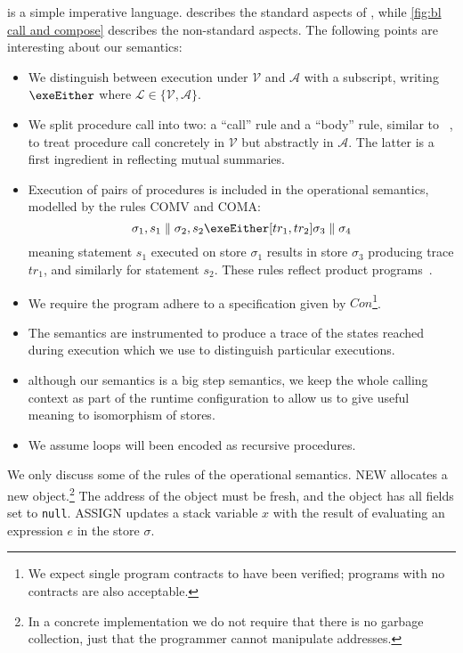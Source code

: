 \documentclass[runningheads,a4paper]{llncs}
\newcommand{\tr}{tr}
\newcommand*{\Contract}{\mathit{Con}}
\newcommand*{\parcomp}{\parallel}
\newcommand*{\metasem}{\mathcal{L}}
\newcommand*\Asemantics{\mathcal{A}}
\newcommand*\Vsemantics{\mathcal{V}}
\newcommand*{\composeRuleAbstract}{\textnormal{COMA}}
\newcommand*{\composeRuleConcrete}{\textnormal{COMV}}%
\newcommand*{\composeRuleVerified}{\composeRuleConcrete{}}
\newcommand*{\blAssign}{ASSIGN}
\newcommand*{\blNew}{NEW}
\newcommand*{\store}{\sigma}
\begin{document}
\lang{} is a simple imperative language.  describes the standard aspects of \lang{}, while \cref{fig:bl call and compose} describes the non-standard aspects. The following points are interesting about our semantics: 
\begin{itemize}
\item  We distinguish between execution under $\Vsemantics$ and $\Asemantics$ with a subscript, writing $\exeEither$ where $\metasem \in \{\Vsemantics,\Asemantics\}$.
\item We split procedure call into two: a ``call'' rule and a ``body'' rule, similar to \citeauthor{Godlin09}~\cite{Godlin09}, to treat procedure call concretely in $\Vsemantics$ but abstractly in $\Asemantics$. The latter is a first ingredient in reflecting mutual summaries.
\item Execution of pairs of procedures is included in the operational semantics, modelled by the rules \composeRuleVerified{} and \composeRuleAbstract{}: \[\store_1,s_1 \parcomp \store_2,s_2 \exeEither[\tr_1,\tr_2] \store_3 \parcomp \store_4\] meaning statement $s_1$ executed on store $\store_1$ results in store $\store_3$ producing trace $\tr_1$, and similarly for statement $s_2$. These rules reflect product programs~\cite{Lahiri2012,Barthe2016,Banerjee2016}.
\item We require the program adhere to a specification given by $\Contract$\footnote{We expect single program contracts to have been verified; programs with no contracts are also acceptable.}.
\item The semantics are instrumented to produce a trace of the states reached during execution which we use to distinguish particular executions.
\item although our semantics is a big step semantics, we keep the whole calling context as part of the runtime configuration to allow us to give useful meaning to isomorphism of stores.
\item We assume loops will been encoded as recursive procedures.
\end{itemize}

We only discuss some of the rules of the operational semantics. \blNew{} allocates a new object.\footnote{In a concrete implementation we do not require that there is no garbage collection, just that the programmer cannot manipulate addresses.} The address of the object must be fresh, and the object has all fields set to \texttt{null}. \blAssign{} updates a stack variable $x$ with the result of evaluating an expression $e$ in the store $\store$.
\end{document}

